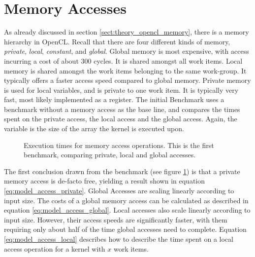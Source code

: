 \section{Memory Accesses}
\label{sect:model_access}
As already discussed in section \ref{sect:theory_opencl_memory}, there is a memory hierarchy in OpenCL. Recall that there are four different kinds of memory, \textit{private}, \textit{local}, \textit{constant}, and \textit{global}. Global memory is most expensive, with access incurring a cost of about 300 cycles. It is shared amongst all work items. Local memory is shared amongst the work items belonging to the same work-group. It typically offers a faster access speed compared to global memory. Private memory is used for local variables, and is private to one work item. It is typically very fast, most likely implemented as a register. The initial Benchmark uses a benchmark without a memory access as the base line, and compares the times spent on the private access, the local access and the global access. Again, the variable is the size of the array the kernel is executed upon. \cite{nvidia2008cuda}\\

\begin{figure}[hbp]
	\begin{center}
		\caption{Execution times for memory access operations. This is the first benchmark, comparing private, local and global accesses.}
		\label{fig:model_access_single}
	\end{center}
\end{figure}

The first conclusion drawn from the benchmark (see figure \ref{fig:model_access_single}) is that a private memory access is de-facto free, yielding a result shown in equation \ref{eq:model_access_private}. Global Accesses are scaling linearly according to input size. The costs of a global memory access can be calculated as described in equation \ref{eq:model_access_global}. Local accesses also scale linearly according to input size. However, their access speeds are significantly faster, with them requiring only about half of the time global accesses need to complete. Equation \ref{eq:model_access_local} describes how to describe the time spent on a local access operation for a kernel with $x$ work items.\\

